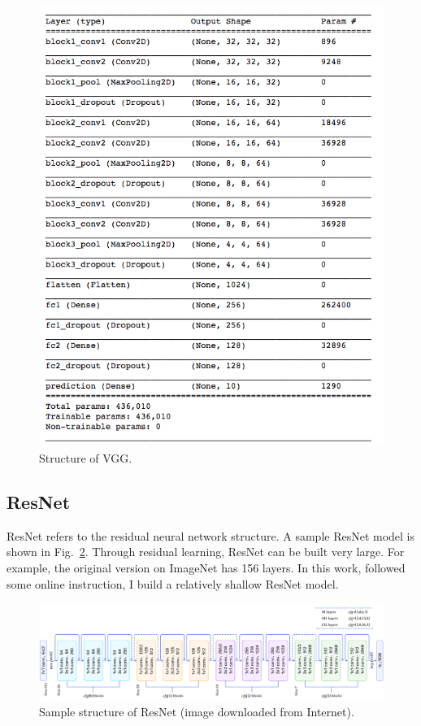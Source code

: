 \begin{figure}[htbp]
\centering
\includegraphics[width=1.0\textwidth]{./figures/vgg.png}
\caption{Structure of VGG.}
\label{fig:vgg} 
\end{figure}


\subsection{ResNet}
ResNet refers to the residual neural network structure. A sample ResNet model is shown in Fig.~\ref{fig:resnet_sample}. Through residual learning, ResNet can be built very large. For example, the original version on ImageNet has 156 layers. In this work, followed some online instruction, I build a relatively shallow ResNet model.

\begin{figure}[htbp]
\centering
\includegraphics[width=1.0\textwidth]{./figures/resnet_image.png}
\caption{Sample structure of ResNet (image downloaded from Internet).}
\label{fig:resnet_sample} 
\end{figure}


